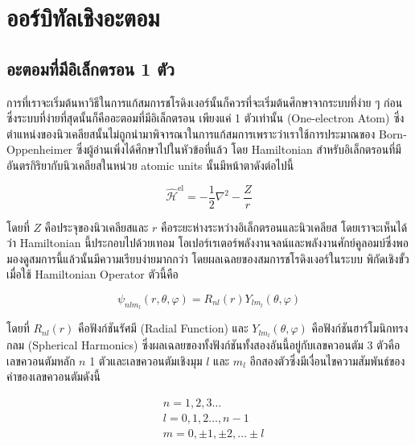\section{ออร์บิทัลเชิงอะตอม}

\subsection{อะตอมที่มีอิเล็กตรอน 1 ตัว}

การที่เราจะเริ่มต้นหาวิธีในการแก้สมการชโรดิงเงอร์นั้นก็ควรที่จะเริ่มต้นศึกษาจากระบบที่ง่าย ๆ ก่อนซึ่งระบบที่ง่ายที่สุดนั้นก็คืออะตอมที่มีอิเล็กตรอน%
เพียงแค่ 1 ตัวเท่านั้น (One-electron Atom)  ซึ่งตำแหน่งของนิวเคลียสนั้นไม่ถูกนำมาพิจารณาในการแก้สมการเพราะว่าเราใช้การประมาณของ
Born-Oppenheimer ซึ่งผู้อ่านเพิ่งได้ศึกษาไปในหัวข้อที่แล้ว โดย Hamiltonian สำหรับอิเล็กตรอนที่มีอันตรกิริยากับนิวเคลียสในหน่วย atomic
units นั้นมีหน้าตาดังต่อไปนี้

\begin{equation}
    \hat{\mathscr{H}}^{\text{el}}
    =
    - \frac{1}{2} \nabla^{2}-\frac{Z}{r}
\end{equation}

โดยที่ $Z$ คือประจุของนิวเคลียสและ $r$ คือระยะห่างระหว่างอิเล็กตรอนและนิวเคลียส โดยเราจะเห็นได้ว่า Hamiltonian นี้ประกอบไปด้วยเทอม%
โอเปอร์เรเตอร์พลังงานจลน์และพลังงานศักย์คูลอมบ์ซึ่งพอมองดูสมการนี้แล้วนั้นมีความเรียบง่ายมากกว่า โดยผลเฉลยของสมการชโรดิงเงอร์ในระบบ%
พิกัดเชิงขั้วเมื่อใช้ Hamiltonian Operator ตัวนี้คือ

\begin{equation}
    \psi_{nlm_{l}} (r, \theta, \varphi)
    =
    R_{nl}(r) Y_{lm_{l}} (\theta, \varphi)
\end{equation}

\noindent โดยที่ $R_{nl}(r)$ คือฟังก์ชันรัศมี (Radial Function) และ $Y_{lm_{l}}(\theta, \varphi)$ คือฟังก์ชันฮาร์โมนิกทรงกลม
(Spherical Harmonics) ซึ่งผลเฉลยของทั้งฟังก์ชันทั้งสองอันนี้อยู่กับเลขควอนตัม 3 ตัวคือเลขควอนตัมหลัก $n$ 1 ตัวและเลขควอนตัมเชิงมุม
$l$ และ $m_{l}$ อีกสองตัวซึ่งมีเงื่อนไขความสัมพันธ์ของค่าของเลขควอนตัมดังนี้

\begin{equation*}
    \begin{aligned}
         & n = 1,2,3 \ldots                  \\
         & l = 0,1,2 \ldots, n-1             \\
         & m = 0, \pm 1, \pm 2, \ldots \pm l
    \end{aligned}
\end{equation*}


